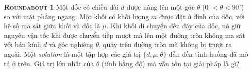 \begin{problem}
{\textbf{\textsc{Roundabout 1}}} Một dốc có chiều dài $d$ được nâng lên một góc $\theta$ ($0^{\circ} < \theta < 90^{\circ}$) so với mặt phẳng ngang. Một khối có khối lượng $m$ được đặt ở đỉnh của dốc, với hệ số ma sát giữa khối và dốc là $\mu$. Khi khối di chuyển đến đáy của dốc, nó giữ nguyên vận tốc khi được chuyển tiếp mượt mà lên một đường tròn không ma sát với bán kính $d$ và góc nghiêng $\theta$, quay trên đường tròn mà không bị trượt ra ngoài. Một \emph{solution} là một tập hợp các giá trị $\{d, \mu, \theta\}$ dẫn đến tình huống đã mô tả ở trên. Giá trị lớn nhất của $\theta$ (tính bằng độ) mà vẫn tồn tại giải pháp là gì? 

\end{problem}